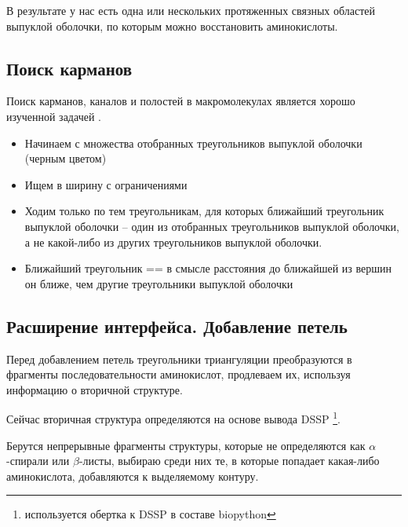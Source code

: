 В результате у нас есть одна или нескольких протяженных связных областей выпуклой оболочки, по которым можно восстановить аминокислоты.
\subsection{Поиск карманов}
Поиск карманов, каналов и полостей в макромолекулах является хорошо изученной задачей \cite{alpha_shapes1995, alpha_shapes1998, caver2007, ppi_kim2006}.  

\begin{itemize}
\item Начинаем с множества отобранных треугольников выпуклой оболочки (черным цветом)
\item Ищем в ширину с ограничениями
\item Ходим только по тем треугольникам, для которых ближайший треугольник выпуклой оболочки -- один из отобранных треугольников выпуклой оболочки, а не какой-либо из других треугольников выпуклой оболочки.
\item Ближайший треугольник == в смысле расстояния до ближайшей из вершин он ближе, чем другие треугольники выпуклой оболочки
\end{itemize}
\cite{alpha_shapes1995, alpha_shapes1998}
\subsection{Расширение интерфейса. Добавление петель}

Перед добавлением петель треугольники триангуляции преобразуются в фрагменты последовательности аминокислот, продлеваем их, используя информацию о вторичной структуре.



Сейчас вторичная структура определяются на основе вывода DSSP \footnote{используется обертка к DSSP в составе biopython}.

Берутся непрерывные фрагменты структуры, которые не определяются как $\alpha$-спирали или $\beta$-листы, выбираю среди них те, в которые попадает какая-либо аминокислота, добавляются к выделяемому контуру.





